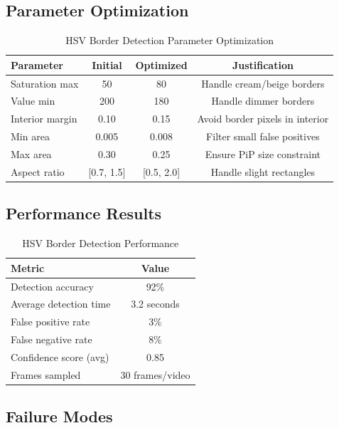 \documentclass[11pt,a4paper]{article}
\begin{document}
\subsection{Parameter Optimization}

\begin{table}[htbp]
\centering
\caption{HSV Border Detection Parameter Optimization}
\label{tab:hsv_params}
\begin{tabular}{@{}lccc@{}}
\toprule
\textbf{Parameter} & \textbf{Initial} & \textbf{Optimized} & \textbf{Justification} \\ \midrule
Saturation max & 50 & 80 & Handle cream/beige borders \\
Value min & 200 & 180 & Handle dimmer borders \\
Interior margin & 0.10 & 0.15 & Avoid border pixels in interior \\
Min area & 0.005 & 0.008 & Filter small false positives \\
Max area & 0.30 & 0.25 & Ensure PiP size constraint \\
Aspect ratio & [0.7, 1.5] & [0.5, 2.0] & Handle slight rectangles \\
\bottomrule
\end{tabular}
\end{table}

\subsection{Performance Results}

\begin{table}[htbp]
\centering
\caption{HSV Border Detection Performance}
\begin{tabular}{@{}lc@{}}
\toprule
\textbf{Metric} & \textbf{Value} \\ \midrule
Detection accuracy & 92\% \\
Average detection time & 3.2 seconds \\
False positive rate & 3\% \\
False negative rate & 8\% \\
Confidence score (avg) & 0.85 \\
Frames sampled & 30 frames/video \\
\bottomrule
\end{tabular}
\end{table}

\subsection{Failure Modes}
\end{document}
